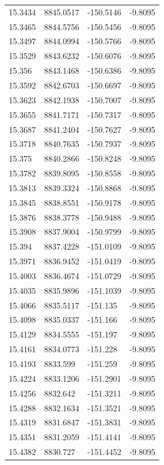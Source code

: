 \begin{table}[H]
\begin{tabular}{llll}
15.3434 & 8845.0517 & -150.5146 & -9.8095 \\
15.3465 & 8844.5756 & -150.5456 & -9.8095 \\
15.3497 & 8844.0994 & -150.5766 & -9.8095 \\
15.3529 & 8843.6232 & -150.6076 & -9.8095 \\
15.356 & 8843.1468 & -150.6386 & -9.8095 \\
15.3592 & 8842.6703 & -150.6697 & -9.8095 \\
15.3623 & 8842.1938 & -150.7007 & -9.8095 \\
15.3655 & 8841.7171 & -150.7317 & -9.8095 \\
15.3687 & 8841.2404 & -150.7627 & -9.8095 \\
15.3718 & 8840.7635 & -150.7937 & -9.8095 \\
15.375 & 8840.2866 & -150.8248 & -9.8095 \\
15.3782 & 8839.8095 & -150.8558 & -9.8095 \\
15.3813 & 8839.3324 & -150.8868 & -9.8095 \\
15.3845 & 8838.8551 & -150.9178 & -9.8095 \\
15.3876 & 8838.3778 & -150.9488 & -9.8095 \\
15.3908 & 8837.9004 & -150.9799 & -9.8095 \\
15.394 & 8837.4228 & -151.0109 & -9.8095 \\
15.3971 & 8836.9452 & -151.0419 & -9.8095 \\
15.4003 & 8836.4674 & -151.0729 & -9.8095 \\
15.4035 & 8835.9896 & -151.1039 & -9.8095 \\
15.4066 & 8835.5117 & -151.135 & -9.8095 \\
15.4098 & 8835.0337 & -151.166 & -9.8095 \\
15.4129 & 8834.5555 & -151.197 & -9.8095 \\
15.4161 & 8834.0773 & -151.228 & -9.8095 \\
15.4193 & 8833.599 & -151.259 & -9.8095 \\
15.4224 & 8833.1206 & -151.2901 & -9.8095 \\
15.4256 & 8832.642 & -151.3211 & -9.8095 \\
15.4288 & 8832.1634 & -151.3521 & -9.8095 \\
15.4319 & 8831.6847 & -151.3831 & -9.8095 \\
15.4351 & 8831.2059 & -151.4141 & -9.8095 \\
15.4382 & 8830.727 & -151.4452 & -9.8095 \\

\end{tabular}
\end{table}
